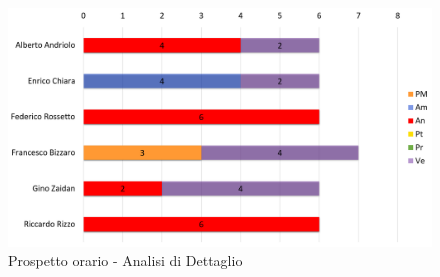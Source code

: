 \begin{figure}[H]
	\centering
	\includegraphics[width= 14cm]{immagini/ad_istogramma.png}
	\caption{Prospetto orario - Analisi di Dettaglio}
\end{figure}
\newpage

